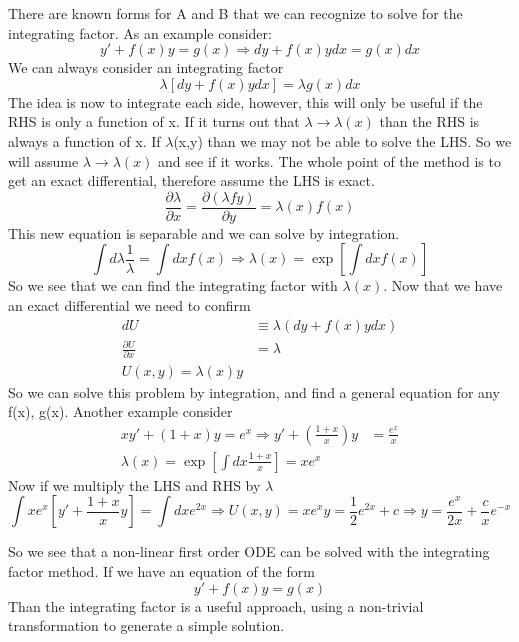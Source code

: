 \documentclass{article}
\newcommand{\be}{\begin{equation}}
\newcommand{\ee}{\end{equation}}
\newcommand{\pd}{\partial}
\begin{document}
There are known forms for A and B that we can recognize to solve for the integrating factor. As an example consider:
\be
y' + f(x) y = g(x) \Rightarrow dy + f(x) y dx = g(x) dx
\ee
We can always consider an integrating factor
\be
\lambda \left[dy + f(x) y dx\right] = \lambda g(x) dx
\ee
The idea is now to integrate each side, however, this will only be useful if the RHS is only a function of x.
If it turns out that $\lambda \rightarrow \lambda(x)$ than the RHS is always a function of x.
If $\lambda$(x,y) than we may not be able to solve the LHS.
So we will assume $\lambda \rightarrow \lambda(x)$ and see if it works.
The whole point of the method is to get an exact differential, therefore assume the LHS is exact.
\be
\frac{\pd\lambda}{\pd x} = \frac{\pd (\lambda f y)}{\pd y} = \lambda(x) f(x)
\ee
This new equation is separable and we can solve by integration.
\be
\int d\lambda \frac{1}{\lambda} = \int dx f(x) \Rightarrow \lambda(x) = \exp\left[\int dx f(x)\right]
\ee
So we see that we can find the integrating factor with $\lambda(x)$.
Now that we have an exact differential we need to confirm
\be
\begin{split}
    dU &\equiv \lambda(dy + f(x)ydx)\\
    \frac{\pd U}{\pd x} &= \lambda\\
    U(x,y) = \lambda(x) y
\end{split}
\ee
So we can solve this problem by integration, and find a general equation for any f(x), g(x). Another example consider
\be
\begin{split}
    xy' + (1+x) y = e^x \Rightarrow y' + \left(\frac{1+x}{x}\right)y &= \frac{e^x}{x}\\
    \lambda(x) = \exp\left[ \int dx \frac{1+x}{x} \right] = xe^x
\end{split}
\ee
Now if we multiply the LHS and RHS by $\lambda$
\be
\int xe^x\left[y' + \frac{1+x}{x} y\right] = \int dx e^{2x} \Rightarrow U(x,y) = xe^xy = \frac{1}{2} e^{2x} + c \Rightarrow y = \frac{e^x}{2x} + \frac{c}{x} e^{-x}
\ee

So we see that a non-linear first order ODE can be solved with the integrating factor method.
If we have an equation of the form
\be
y' + f(x)y = g(x)
\ee
Than the integrating factor is a useful approach, using a non-trivial transformation to generate a simple solution.
\end{document}
